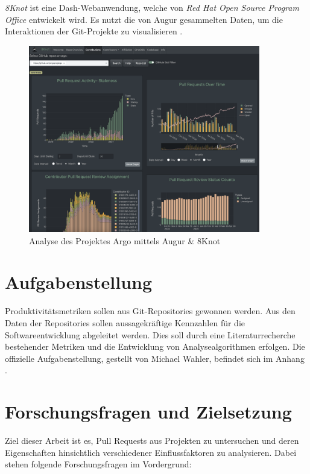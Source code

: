 \textit{8Knot} ist eine Dash-Webanwendung, welche von \textit{Red Hat Open Source Program Office} entwickelt wird. Es nutzt die von Augur gesammelten Daten, um die Interaktionen der Git-Projekte zu visualisieren \parencite{noauthor_chaossaugur_nodate} \parencite{noauthor_oss-aspen8knot_2025}. 
\begin{figure}[htbp]
    \centering
    \includegraphics[width=0.9\textwidth]{Figures/augur-8knot.png}
    \caption{Analyse des Projektes Argo mittels Augur \& 8Knot \parencite{noauthor_metrixchaossio_nodate} \parencite{noauthor_argoprojargo-workflows_2025}}
    \label{fig:augur-8knot}
\end{figure}

\newpage


\section{Aufgabenstellung}
Produktivitätsmetriken sollen aus Git-Repositories gewonnen werden. Aus den Daten der Repositories sollen aussagekräftige Kennzahlen für die Softwareentwicklung abgeleitet werden. Dies soll durch eine Literaturrecherche bestehender Metriken und die Entwicklung von Analysealgorithmen erfolgen.
Die offizielle Aufgabenstellung, gestellt von Michael Wahler, befindet sich im Anhang .

\section{Forschungsfragen und Zielsetzung}
\label{sec:Zielsetzung}

Ziel dieser Arbeit ist es, Pull Requests aus Projekten zu untersuchen und deren Eigenschaften hinsichtlich verschiedener Einflussfaktoren zu analysieren. Dabei stehen folgende Forschungsfragen im Vordergrund:

